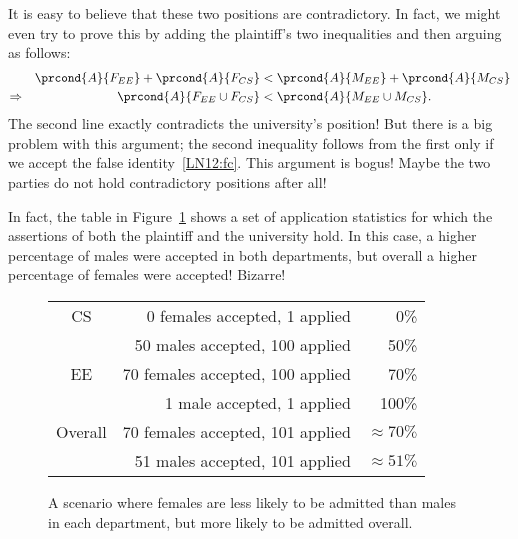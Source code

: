 It is easy to believe that these two positions are contradictory.  In
fact, we might even try to prove this by adding the plaintiff's two
inequalities and then arguing as follows:
%
\begin{align*}
&& \prcond{A}{F_{EE}} + \prcond{A}{F_{CS}} & <
	\prcond{A}{M_{EE}} + \prcond{A}{M_{CS}} \\
\Rightarrow &&
\prcond{A}{F_{EE} \cup F_{CS}} & <
	\prcond{A}{M_{EE} \cup M_{CS}}.
\end{align*}
%
The second line exactly contradicts the university's position!  But there
is a big problem with this argument; the second inequality follows from
the first only if we accept the false identity~\eqref{LN12:fc}.  This argument
is bogus!  Maybe the two parties do not hold contradictory positions after
all!

In fact, the table in Figure~\ref{fig:15D3} shows a set of application
statistics for which the assertions of both the plaintiff and the
university hold.  In this case, a higher percentage of males were
accepted in both departments, but overall a higher percentage of
females were accepted!  Bizarre!

\begin{figure}\redrawntrue

\begin{tabular}{crr}
CS & 0 females accepted, 1 applied      &   0\% \\
   & 50 males accepted, 100 applied     &  50\% \\
EE & 70 females accepted, 100 applied   &  70\% \\
   & 1 male accepted, 1 applied         & 100\% \\
\hline
Overall & 70 females accepted, 101 applied & $\approx 70\%$ \\
        & 51 males accepted, 101 applied   & $\approx 51\%$
\end{tabular}

\caption{A scenario where females are less likely to be admitted than
  males in each department, but more likely to be admitted overall.}

\label{fig:15D3}

\end{figure}

\problemsection

\endinput
